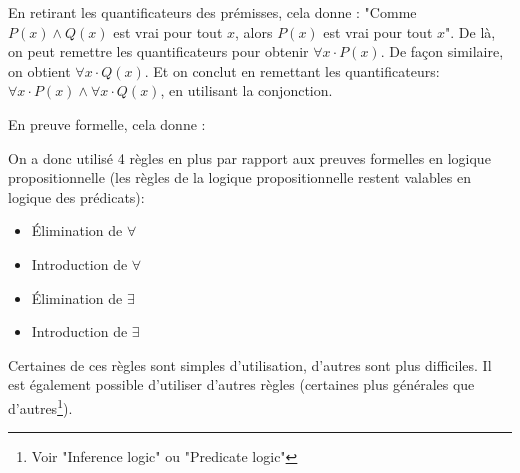 En retirant les quantificateurs des prémisses, cela donne :
"Comme $P(x) \wedge Q(x)$ est vrai pour tout $x$, alors $P(x)$ est vrai pour tout $x$". 
De là, on peut remettre les quantificateurs pour obtenir $\forall x \cdot P(x)$. De façon similaire, on obtient $\forall x \cdot Q(x)$. Et on conclut en remettant les quantificateurs: $\forall x \cdot P(x) \wedge \forall x \cdot Q(x)$, en utilisant la conjonction.

En preuve formelle, cela donne :

\begin{center}
\end{center}

On a donc utilisé 4 règles en plus par rapport aux preuves formelles en logique propositionnelle (les règles de la logique propositionnelle restent valables en logique des prédicats):
\begin{itemize}
\item Élimination de $\forall$
\item Introduction de $\forall$
\item Élimination de $\exists$
\item Introduction de $\exists$
\end{itemize}

Certaines de ces règles sont simples d'utilisation, d'autres sont plus difficiles. Il est également possible d'utiliser d'autres règles (certaines plus générales que d'autres\footnote{Voir "Inference logic" ou "Predicate logic"}).

